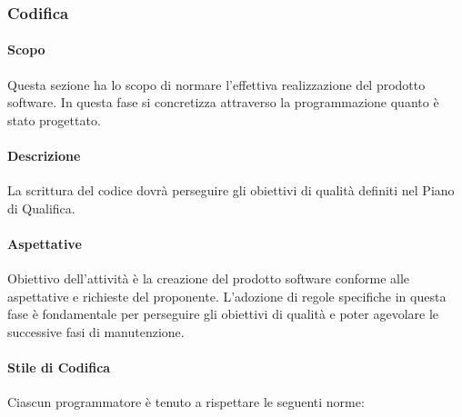 \subsubsection{Codifica}
\paragraph{Scopo}
Questa sezione ha lo scopo di normare l'effettiva realizzazione del prodotto software.  In questa fase si concretizza attraverso la programmazione quanto è stato progettato.

\paragraph{Descrizione}
La scrittura del codice dovrà perseguire gli obiettivi di qualità definiti nel Piano di Qualifica.

\paragraph{Aspettative}
Obiettivo dell'attività è la creazione del prodotto software conforme alle aspettative e richieste del proponente.  L'adozione di regole specifiche in questa fase è fondamentale per perseguire gli obiettivi di qualità e poter agevolare le successive fasi di manutenzione.

\paragraph{Stile di Codifica}
Ciascun programmatore è tenuto a rispettare le seguenti norme:

